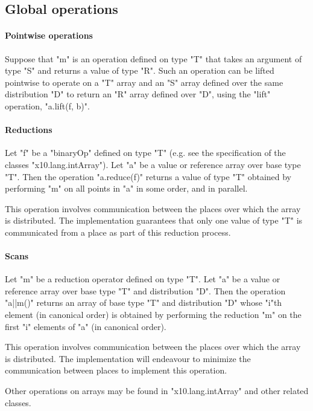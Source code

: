 

\subsection{Global operations }
\paragraph{Pointwise operations}\label{ArrayPointwise}
Suppose that \xcd"m" is an operation defined on type \xcd"T" that
takes an argument of type \xcd"S" and returns a value of type
\xcd"R". Such an operation can be lifted pointwise to operate on a \xcd"T"
array and an \xcd"S" array defined over the same distribution \xcd"D"
to return an \xcd"R" array defined over \xcd"D", using the
\xcd"lift" operation, \xcd"a.lift(f, b)".


\paragraph{Reductions}\label{ArrayReductions}

Let \xcd"f" be a \xcd"binaryOp" defined on type \xcd"T" (e.g.{} see
the specification of the classes \xcd"x10.lang.intArray").  Let
\xcd"a" be a value or reference array over base type \xcd"T". Then the
operation \xcd"a.reduce(f)" returns a value of type \xcd"T" obtained
by performing \xcd"m" on all points in \xcd"a" in some order, and in
parallel.

This operation involves communication between the places over which
the array is distributed. The \Xten{} implementation guarantees that
only one value of type \xcd"T" is communicated from a place as part of
this reduction process.

\paragraph{Scans}\label{ArrayScans}

Let \xcd"m" be a reduction operator defined on type \xcd"T". Let
\xcd"a" be a value or reference array over base type \xcd"T" and
distribution \xcd"D". Then the operation \xcd"a||m()" returns an array
of base type \xcd"T" and distribution \xcd"D" whose \xcd"i"th element
(in canonical order) is obtained by performing the reduction \xcd"m"
on the first \xcd"i" elements of \xcd"a" (in canonical order).

This operation involves communication between the places over which
the array is distributed. The \Xten{} implementation will endeavour to
minimize the communication between places to implement this operation.

Other operations on arrays may be found in \xcd"x10.lang.intArray" and
other related classes.

